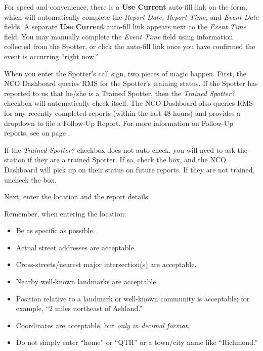 \documentclass[pdflatex,letterpaper,twoside,12pt]{book}
\begin{document}
For speed and convenience, there is a \textbf{Use Current} auto-fill link on the form, which will automatically complete the \emph{Report Date, Report Time,} and \emph{Event Date} fields.  A separate \textbf{Use Current} auto-fill link appears next to the \emph{Event Time} field.  You may manually complete the \emph{Event Time} field using information collected from the Spotter, or click the auto-fill link once you have confirmed the event is occurring ``right now.''

When you enter the Spotter's call sign, two pieces of magic happen.  First, the NCO Dashboard queries RMS for the Spotter's training status.  If the Spotter has reported to us that he/she is a Trained Spotter, then the \emph{Trained Spotter?} checkbox will automatically check itself.  The NCO Dashboard also queries RMS for any recently completed reports (within the last 48 hours) and provides a dropdown to file a Follow-Up Report.  For more information on Follow-Up reports, see  on page \pageref{follow-up-reports}.

If the \emph{Trained Spotter?} checkbox does not auto-check, you will need to ask the station if they are a trained Spotter.  If so, check the box, and the NCO Dashboard will pick up on their status on future reports.  If they are not trained, uncheck the box.


Next, enter the location and the report details.

Remember, when entering the location:

\begin{itemize}
\item Be as specific as possible.
\item Actual street addresses are acceptable.
\item Cross-streets/nearest major intersection(s) are acceptable.
\item Nearby well-known landmarks are acceptable.
\item Position relative to a landmark or well-known community is acceptable;  for example, ``2 miles northeast of Ashland.''
\item Coordinates are acceptable, but \emph{only in decimal format}.
\item Do not simply enter ``home'' or ``QTH'' or a town/city name like ``Richmond.''
\end{itemize}
\end{document}
